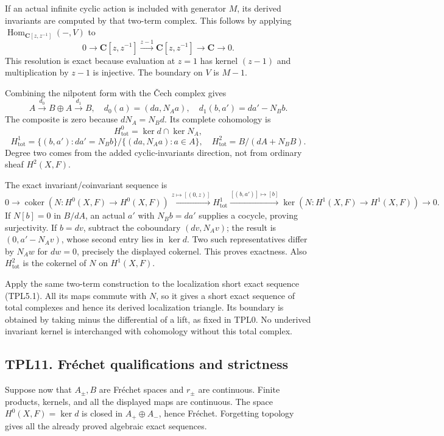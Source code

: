 If an actual infinite cyclic action is included with generator \(M\),
its derived invariants are computed by that two-term complex. This
follows by applying \(\operatorname{Hom}_{\mathbf C[z,z^{-1}]}(-,V)\) to
\[
0\to\mathbf C[z,z^{-1}]\xrightarrow{z-1}
\mathbf C[z,z^{-1}]\to\mathbf C\to0.
\] This resolution is exact because evaluation at \(z=1\) has kernel
\((z-1)\) and multiplication by \(z-1\) is injective. The boundary on
\(V\) is \(M-1\).

Combining the nilpotent form with the Čech complex gives \[
\boxed{A\xrightarrow{d_0}B\oplus A\xrightarrow{d_1}B,\quad
d_0(a)=(da,N_Aa),\quad d_1(b,a')=da'-N_Bb.}
\tag{TPL10.3}
\] The composite is zero because \(dN_A=N_Bd\). Its complete cohomology
is \[
H^0_{\mathrm{tot}}=\ker d\cap\ker N_A,
\] \[
H^1_{\mathrm{tot}}=
\{(b,a'):da'=N_Bb\}/\{(da,N_Aa):a\in A\},
\quad
H^2_{\mathrm{tot}}=B/(dA+N_BB).
\tag{TPL10.4}
\] Degree two comes from the added cyclic-invariants direction, not from
ordinary sheaf \(H^2(X,F)\).

The exact invariant/coinvariant sequence is \[
0\to\operatorname{coker}(N:H^0(X,F)\to H^0(X,F))
\xrightarrow{z\mapsto[(0,z)]}H^1_{\mathrm{tot}}
\xrightarrow{[(b,a')]\mapsto[b]}
\ker(N:H^1(X,F)\to H^1(X,F))\to0.
\tag{TPL10.5}
\] If \(N[b]=0\) in \(B/dA\), an actual \(a'\) with \(N_Bb=da'\)
supplies a cocycle, proving surjectivity. If \(b=dv\), subtract the
coboundary \((dv,N_Av)\); the result is \((0,a'-N_Av)\), whose second
entry lies in \(\ker d\). Two such representatives differ by \(N_Aw\)
for \(dw=0\), precisely the displayed cokernel. This proves exactness.
Also \(H^2_{\mathrm{tot}}\) is the cokernel of \(N\) on \(H^1(X,F)\).

Apply the same two-term construction to the localization short exact
sequence (TPL5.1). All its maps commute with \(N\), so it gives a short
exact sequence of total complexes and hence its derived localization
triangle. Its boundary is obtained by taking minus the differential of a
lift, as fixed in TPL0. No underived invariant kernel is interchanged
with cohomology without this total complex.

\subsection{TPL11. Fréchet qualifications and
strictness}\label{tpl11.-fruxe9chet-qualifications-and-strictness}

Suppose now that \(A_\pm,B\) are Fréchet spaces and \(r_\pm\) are
continuous. Finite products, kernels, and all the displayed maps are
continuous. The space \(H^0(X,F)=\ker d\) is closed in
\(A_+\oplus A_-\), hence Fréchet. Forgetting topology gives all the
already proved algebraic exact sequences.


